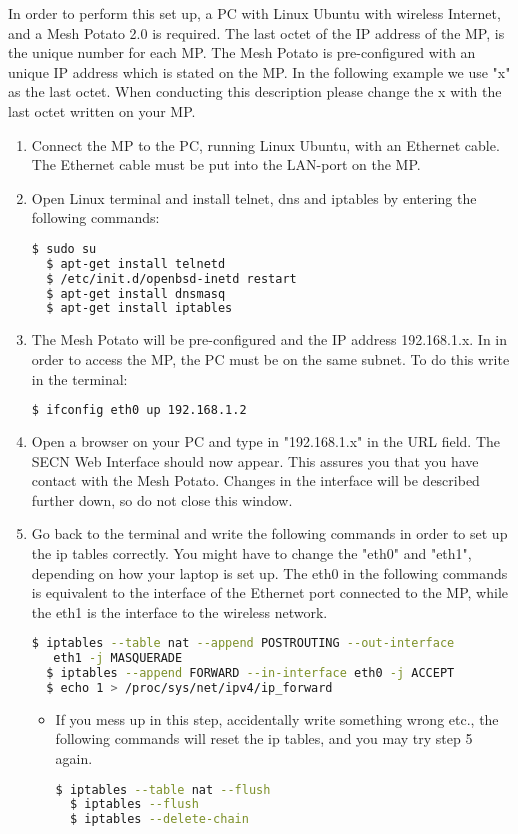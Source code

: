 
In order to perform this set up, a PC with Linux Ubuntu with wireless Internet, and a Mesh Potato 2.0 is required. The last octet of the IP address of the MP, is the unique number for each MP. The Mesh Potato is pre-configured with an unique IP address which is stated on the MP. In the following example we use "x" as the last octet. When conducting this description please change the x with the last octet written on your MP.

\begin{enumerate}
\item Connect the MP to the PC, running Linux Ubuntu, with an Ethernet cable. The Ethernet cable must be put into the LAN-port on the MP. 

\item Open Linux terminal and install telnet, dns and iptables by entering the following commands: 
\noindent
\begin{lstlisting}[language=bash]
  $ sudo su
  $ apt-get install telnetd
  $ /etc/init.d/openbsd-inetd restart 
  $ apt-get install dnsmasq
  $ apt-get install iptables
\end{lstlisting}

\item The Mesh Potato will be pre-configured and the IP address 192.168.1.x. In in order to access the MP, the PC must be on the same subnet. To do this write in the terminal: 
\noindent
\begin{lstlisting}[language=bash]
  $ ifconfig eth0 up 192.168.1.2
\end{lstlisting}

\item Open a browser on your PC and type in "192.168.1.x" in the URL field. The SECN Web Interface should now appear. This assures you that you have contact with the Mesh Potato. Changes in the interface will be described further down, so do not close this window.  

\item Go back to the terminal and write the following commands in order to set up the ip tables correctly. You might have to change the "eth0" and "eth1", depending on how your laptop is set up. The eth0 in the following commands is equivalent to the interface of the Ethernet port connected to the MP, while the eth1 is the interface to the wireless network. 
\noindent
\begin{lstlisting}[language=bash]
  $ iptables --table nat --append POSTROUTING --out-interface
   eth1 -j MASQUERADE
  $ iptables --append FORWARD --in-interface eth0 -j ACCEPT
  $ echo 1 > /proc/sys/net/ipv4/ip_forward
\end{lstlisting} 
\begin{itemize}
\item If you mess up in this step, accidentally write something wrong etc., the following commands will reset the ip tables, and you may try step 5 again.
\noindent
\begin{lstlisting}[language=bash]
  $ iptables --table nat --flush
  $ iptables --flush
  $ iptables --delete-chain
\end{lstlisting}
\end{itemize}  


\end{enumerate}

